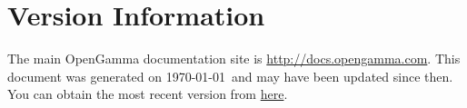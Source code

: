 
\section{Version Information}

\noindent The main OpenGamma documentation site is \url{http://docs.opengamma.com}. This document was generated on \today~and may have been updated since then. You can obtain the most recent version from \href{http://docs-static.opengamma.com/Latest\%20Version/analytics/<< s.canonical_filename().replace(".tex", ".pdf") >>}{here}.


